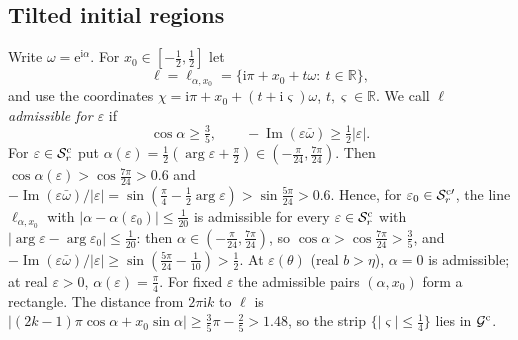 \documentclass[11pt]{amsart}
\theoremstyle{definition}
\newcommand{\eee}{\mathrm{e}}
\newcommand{\ii}{\mathrm{i}}
\begin{document}
\subsection{Tilted initial regions}
Write $\omega=\eee^{\ii\alpha}$.  For $x_0\in[-\tfrac12,\tfrac12]$ let
\[
 \ell=\ell_{\alpha,x_0}=\{\ii\pi+x_0+t\omega:\ t\in\mathbb R\},
\]
and use the coordinates $\chi=\ii\pi+x_0+(t+\ii\varsigma)\omega$, $t,\varsigma\in\mathbb R$.
We call $\ell$ \emph{admissible for $\varepsilon$} if
\begin{equation}\label{eq:admissible}
 \cos\alpha\ge\tfrac35,\qquad -\operatorname{Im}(\varepsilon\bar\omega)\ge\tfrac12|\varepsilon| .
\end{equation}
For $\varepsilon\in\mathcal S^{\rm c}_r$ put
$\alpha(\varepsilon)=\tfrac12(\arg\varepsilon+\tfrac\pi2)\in(-\tfrac\pi{24},\tfrac{7\pi}{24})$.
Then $\cos\alpha(\varepsilon)>\cos\tfrac{7\pi}{24}>0.6$ and
$-\operatorname{Im}(\varepsilon\bar\omega)/|\varepsilon|=\sin(\tfrac\pi4-\tfrac12\arg\varepsilon)>\sin\tfrac{5\pi}{24}>0.6$.
Hence, for $\varepsilon_0\in\mathcal S^{\rm c\prime}_r$, the line $\ell_{\alpha,x_0}$ with
$|\alpha-\alpha(\varepsilon_0)|\le\tfrac1{20}$ is admissible for every $\varepsilon\in\mathcal S^{\rm c}_r$ with
$|\arg\varepsilon-\arg\varepsilon_0|\le\tfrac1{20}$: then $\alpha\in(-\tfrac\pi{24},\tfrac{7\pi}{24})$, so
$\cos\alpha>\cos\tfrac{7\pi}{24}>\tfrac35$, and
$-\operatorname{Im}(\varepsilon\bar\omega)/|\varepsilon|\ge\sin(\tfrac{5\pi}{24}-\tfrac1{10})>\tfrac12$.  At
$\varepsilon(\theta)$ (real $b>\eta$), $\alpha=0$ is admissible; at real $\varepsilon>0$,
$\alpha(\varepsilon)=\tfrac\pi4$.  For fixed $\varepsilon$ the admissible pairs $(\alpha,x_0)$ form a
rectangle.  The distance from $2\pi\ii k$ to $\ell$ is
$|(2k-1)\pi\cos\alpha+x_0\sin\alpha|\ge\tfrac35\pi-\tfrac25>1.48$, so the strip
$\{|\varsigma|\le\tfrac14\}$ lies in $\mathcal G^{\rm c}$.
\end{document}
